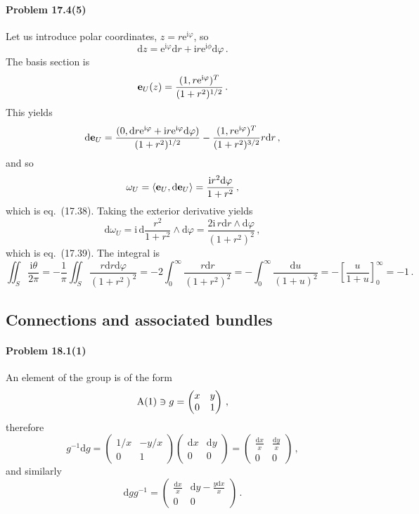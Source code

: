 \documentclass[a4paper,12pt]{article}
\def\d{\mathrm{d}}
\def\e{\mathrm{e}}
\def\imagi{\mathrm{i}}
\newcommand{\problem}[1]{\paragraph{Problem #1}}
\begin{document}

\problem{17.4(5)} Let us introduce polar coordinates, $z = r\e^{\imagi\varphi}$, so
\[
 \d z = \e^{\imagi\varphi}\d r + \imagi r \e^{\imagi \phi}\d\varphi\,.
\]
The basis section is
\[
 {\bf e}_U(z) = \frac{(1,r\e^{\imagi \varphi})^T}{(1+r^2)^{1/2}}\,.
\]
This yields
\[
 \d{\bf e}_U = \frac{(0, \d r \e^{\imagi\varphi}+\imagi r \e^{\imagi \varphi}\d\varphi)}{(1+r^2)^{1/2}} - \frac{(1, r\e^{\imagi \varphi})^T}{(1+r^2)^{3/2}}r\d r\,,
\]
and so
\[
 \omega_U = \langle {\bf e}_U, \d{\bf e}_U \rangle = \frac{\imagi r^2\d\varphi}{1+r^2}\,,
\]
which is eq.\ (17.38). Taking the exterior derivative yields
\[
 \d\omega_U = \imagi\,\d\frac{r^2}{1+r^2}\wedge\d\varphi = \frac{2\imagi\,r\d r\wedge\d\varphi}{(1+r^2)^2}\,,
\]
which is eq.\ (17.39). The integral is
\[
 \iint_S \frac{\imagi \theta}{2\pi} = -\frac{1}{\pi}\iint_S \frac{r\d r \d\varphi}{(1+r^2)^2} =- 2\int_0^\infty \frac{r\d r}{(1+r^2)^2} =- \int_0^\infty \frac{\d u}{(1+u)^2} = -\left[ \frac{u}{1+u}\right]_0^\infty = -1\,.
\]


\subsection{Connections and associated bundles}


\problem{18.1(1)} An element of the group is of the form
\[
 {\rm A}(1) \ni g=\begin{pmatrix}x & y \\ 0 & 1 \end{pmatrix}\,,
\]
therefore
\[
 g^{-1}\d g = \begin{pmatrix} 1/x & -y/x \\ 0 & 1 \end{pmatrix} \begin{pmatrix} \d x & \d y \\ 0 & 0 \end{pmatrix} = \begin{pmatrix} \frac{\d x}{x} & \frac{\d y}{x} \\ 0 & 0 \end{pmatrix}\,,
\]
and similarly
\[
 \d g g^{-1} = 
 \begin{pmatrix}
  \frac{\d x}{x} & \d y -\frac{y\d x}{x} \\
  0 & 0
 \end{pmatrix}\,.
\]
\end{document}
